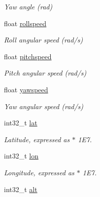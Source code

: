 \begin{DoxyCompactItemize}
\begin{DoxyCompactList}\small\item\em Yaw angle (rad) \end{DoxyCompactList}\item 
float \hyperlink{struct____mavlink__hil__state__t_a308aa515448a4d8d25131ce7c0f3254d}{rollspeed}
\begin{DoxyCompactList}\small\item\em Roll angular speed (rad/s) \end{DoxyCompactList}\item 
float \hyperlink{struct____mavlink__hil__state__t_ad7d8b42ee6698e6f892c20146f954d5a}{pitchspeed}
\begin{DoxyCompactList}\small\item\em Pitch angular speed (rad/s) \end{DoxyCompactList}\item 
float \hyperlink{struct____mavlink__hil__state__t_a50f16fd863e535867c95fabcfef2e498}{yawspeed}
\begin{DoxyCompactList}\small\item\em Yaw angular speed (rad/s) \end{DoxyCompactList}\item 
\hypertarget{struct____mavlink__hil__state__t_afb2b29710c1a8b69503e35a72473c6d3}{int32\+\_\+t \hyperlink{struct____mavlink__hil__state__t_afb2b29710c1a8b69503e35a72473c6d3}{lat}}\label{struct____mavlink__hil__state__t_afb2b29710c1a8b69503e35a72473c6d3}

\begin{DoxyCompactList}\small\item\em Latitude, expressed as $\ast$ 1\+E7. \end{DoxyCompactList}\item 
\hypertarget{struct____mavlink__hil__state__t_aeac8427298a17d090889edf71a21c6ac}{int32\+\_\+t \hyperlink{struct____mavlink__hil__state__t_aeac8427298a17d090889edf71a21c6ac}{lon}}\label{struct____mavlink__hil__state__t_aeac8427298a17d090889edf71a21c6ac}

\begin{DoxyCompactList}\small\item\em Longitude, expressed as $\ast$ 1\+E7. \end{DoxyCompactList}\item 
\hypertarget{struct____mavlink__hil__state__t_a8f4ac2f2f4948df71b4abbb50d7c2f2f}{int32\+\_\+t \hyperlink{struct____mavlink__hil__state__t_a8f4ac2f2f4948df71b4abbb50d7c2f2f}{alt}}\label{struct____mavlink__hil__state__t_a8f4ac2f2f4948df71b4abbb50d7c2f2f}


\end{DoxyCompactItemize}
